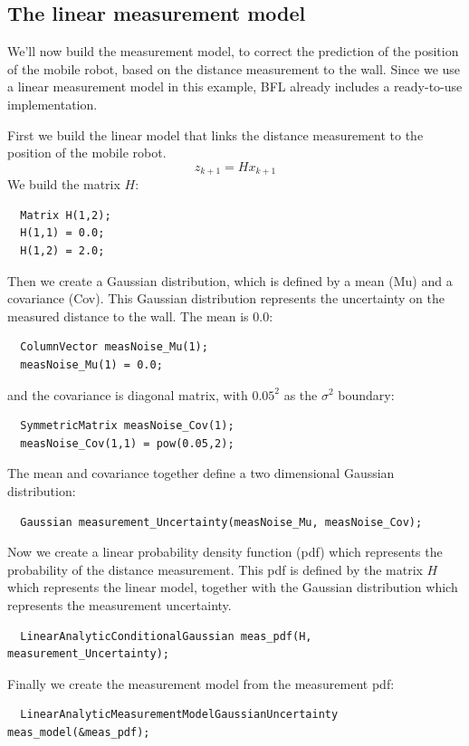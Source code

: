 \documentclass[a4paper,10pt]{report}
\begin{document}
\subsection{The linear measurement model}
We'll now build the measurement model, to correct the prediction of
the position of the mobile robot, based on the distance measurement to
the wall. Since we use a linear measurement model in this example, BFL
already includes a ready-to-use implementation.

First we build the linear model that links the distance measurement to
the position of the mobile robot.
\begin{equation}
  {z}_{k+1} = {H} {x}_{k+1}
\end{equation}
We build the matrix ${H}$:
\begin{verbatim}
  Matrix H(1,2);
  H(1,1) = 0.0;
  H(1,2) = 2.0;
\end{verbatim}
Then we create a Gaussian distribution, which is defined by a mean
(Mu) and a covariance (Cov). This Gaussian distribution represents the
uncertainty on the measured distance to the wall. The mean is $0.0$:
\begin{verbatim}
  ColumnVector measNoise_Mu(1);
  measNoise_Mu(1) = 0.0;
\end{verbatim}
and the covariance is diagonal matrix, with $0.05^2$ as the $\sigma^2$
boundary:
\begin{verbatim}
  SymmetricMatrix measNoise_Cov(1);
  measNoise_Cov(1,1) = pow(0.05,2);
\end{verbatim}
The mean and covariance together define a two dimensional Gaussian
distribution:
\begin{verbatim}
  Gaussian measurement_Uncertainty(measNoise_Mu, measNoise_Cov);
\end{verbatim}

Now we create a linear probability density function (pdf) which
represents the probability of the distance measurement. This pdf is
defined by the matrix ${H}$ which represents the linear model,
together with the Gaussian distribution which represents the
measurement uncertainty.
\begin{verbatim}
  LinearAnalyticConditionalGaussian meas_pdf(H,
measurement_Uncertainty);
\end{verbatim}
Finally we create the measurement model from the measurement pdf:
\begin{verbatim}
  LinearAnalyticMeasurementModelGaussianUncertainty meas_model(&meas_pdf);
\end{verbatim}
\end{document}
